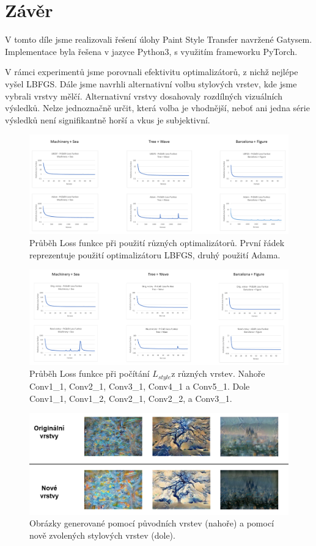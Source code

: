 \documentclass[twocolumn]{article}
\begin{document}
	
	\section*{Závěr}
	V tomto díle jsme realizovali řešení úlohy Paint Style Transfer navržené Gatysem. Implementace byla řešena v jazyce Python3, s využitím frameworku PyTorch.
	\par
	V rámci experimentů jsme porovnali efektivitu optimalizátorů, z nichž nejlépe vyšel LBFGS. Dále jsme navrhli alternativní volbu stylových vrstev, kde jsme vybrali vrstvy mělčí. Alternativní vrstvy dosahovaly rozdílných vizuálních výsledků. Nelze jednoznačně určit, která volba je vhodnější, neboť ani jedna série výsledků není signifikantně horší a vkus je subjektivní.
	

		\begin{figure}[t]
		\includegraphics[width=18cm]{Ex1G_lez.png}
		\caption{Průběh Loss funkce při použití různých optimalizátorů. První řádek reprezentuje použití optimalizátoru LBFGS, druhý použití Adama.}
		\label{exp1G}
	\end{figure}
	
	
	\begin{figure}[t]
		\includegraphics[width=18cm]{Ex2G_lez.png}
		\caption{Průběh Loss funkce při počítání $L_{style}$z různých vrstev. Nahoře Conv1\_1, Conv2\_1, Conv3\_1, Conv4\_1 a Conv5\_1. Dole Conv1\_1, Conv1\_2, Conv2\_1, Conv2\_2, a Conv3\_1.}
		\label{Exp2_G}
	\end{figure}

	
\begin{figure}[h]
	\includegraphics[width=\linewidth]{Ex2O_lez.png}
	\centering
	\caption{Obrázky generované pomocí původních vrstev (nahoře) a pomocí nově zvolených stylových vrstev (dole).}
	\label{Exp2_O}
\end{figure}
\end{document}
